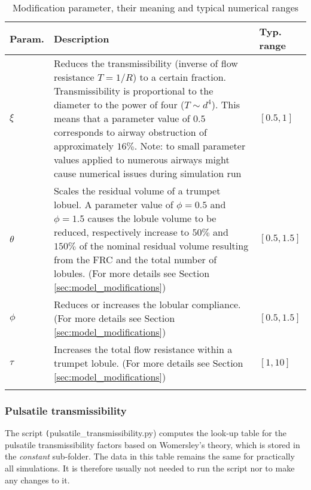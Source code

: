 \begin{table}
  \caption{Modification parameter, their meaning and typical numerical ranges}
  \begin{tabular}{L{0.1\textwidth} L{0.7\textwidth} C{0.1\textwidth}}
    \toprule
    Param.             & Description  & Typ. range \\
    \midrule
    $\xi$              & Reduces the transmissibility (inverse of flow resistance $T = 1/R$) to a certain fraction. Transmissibility is proportional to the diameter to the power of four ($T\sim d^4$). This means that a parameter value of $0.5$ corresponds to airway obstruction of approximately $16\%$. Note: to small parameter values applied to numerous airways might cause numerical issues during simulation run & $[0.5, 1]$ \\
    \midrule
    $\theta$           & Scales the residual volume of a trumpet lobuel. A parameter value of $\phi = 0.5$ and $\phi = 1.5$ causes the lobule volume to be reduced, respectively increase to $50\%$ and $150\%$ of the nominal residual volume resulting from the FRC and the total number of lobules. (For more details see Section \ref{sec:model_modifications}) & $[0.5, 1.5]$ \\
    \midrule
    $\phi$             & Reduces or increases the lobular compliance. (For more details see Section \ref{sec:model_modifications}) & $[0.5, 1.5]$ \\
    \midrule
    $\tau$             & Increases the total flow resistance within a trumpet lobule. (For more details see Section \ref{sec:model_modifications}) & $[1, 10]$ \\
    \bottomrule
    \label{tab:modification_parameter}
  \end{tabular}

\end{table}


\subsubsection{Pulsatile transmissibility}
The script \texttt(pulsatile\_transmissibility.py) computes the look-up table for the pulsatile transmissibility factors based on Womersley's \citep{Womersley1957} theory, which is stored in the \textit{constant} sub-folder.
The data in this table remains the same for practically all simulations.
It is therefore usually not needed to run the script nor to make any changes to it.

